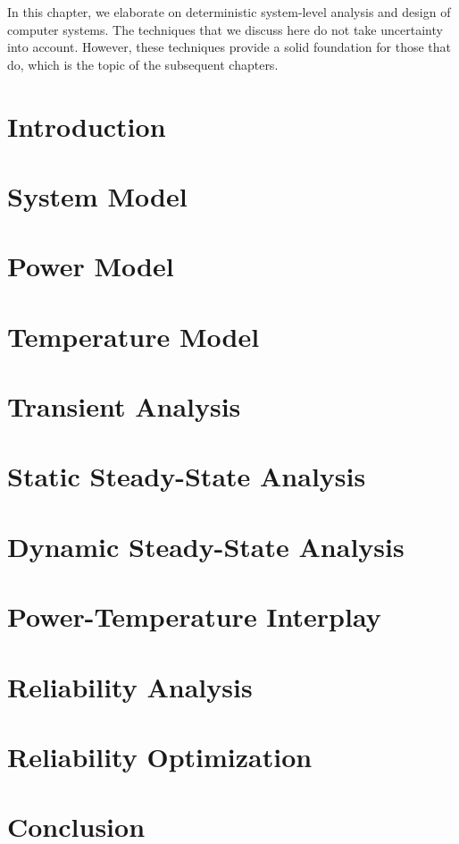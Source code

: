 In this chapter, we elaborate on deterministic system-level analysis and design
of computer systems. The techniques that we discuss here do not take uncertainty
into account. However, these techniques provide a solid foundation for those
that do, which is the topic of the subsequent chapters.

\section{Introduction}

\section{System Model}

\section{Power Model}

\section{Temperature Model}

\section{Transient Analysis}

\section{Static Steady-State Analysis}

\section{Dynamic Steady-State Analysis}

\section{Power-Temperature Interplay}

\section{Reliability Analysis}

\section{Reliability Optimization}

\section{Conclusion}
